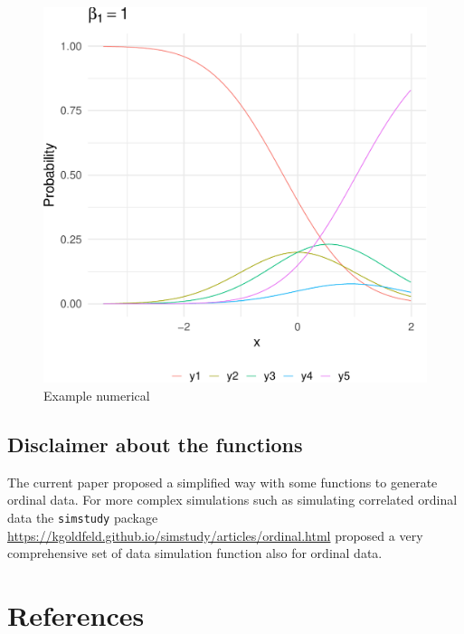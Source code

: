 \documentclass[
  man,floatsintext]{apa6}
\begin{document}
\begin{figure}

{\centering \includegraphics{paper-new_files/figure-latex/ex-numerical-1} 

}

\caption{Example numerical}\label{fig:ex-numerical}
\end{figure}

\subsection{Disclaimer about the functions}\label{disclaimer-about-the-functions}

The current paper proposed a simplified way with some functions to generate ordinal data. For more complex simulations such as simulating correlated ordinal data the \texttt{simstudy} package \url{https://kgoldfeld.github.io/simstudy/articles/ordinal.html} proposed a very comprehensive set of data simulation function also for ordinal data.

\newpage

\section{References}\label{references}
\end{document}
